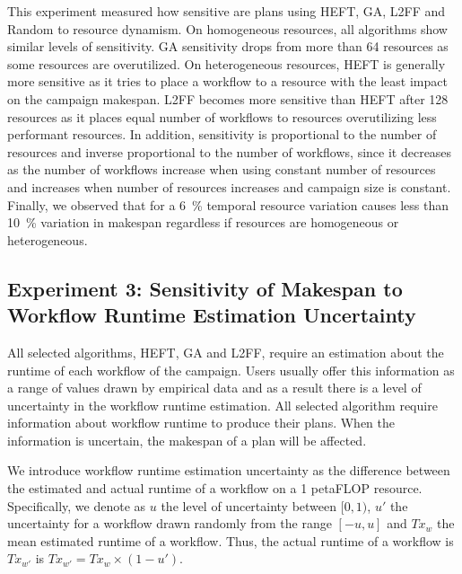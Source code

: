 This experiment measured how sensitive are plans using HEFT, GA, L2FF and Random to resource dynamism.
On homogeneous resources, all algorithms show similar levels of sensitivity.
GA sensitivity drops from more than 64 resources as some resources are overutilized.
On heterogeneous resources, HEFT is generally more sensitive as it tries to place a workflow to a resource with the least impact on the campaign makespan.
L2FF becomes more sensitive than HEFT after 128 resources as it places equal number of workflows to resources overutilizing less performant resources.
In addition, sensitivity is proportional to the number of resources and inverse proportional to the number of workflows, since it decreases as the number of workflows increase when using constant number of resources and increases when number of resources increases and campaign size is constant.
Finally, we observed that for a 6~\% temporal resource variation causes less than 10~\% variation in makespan regardless if resources are homogeneous or heterogeneous.


\subsection{Experiment 3: Sensitivity of Makespan to Workflow Runtime Estimation Uncertainty}

All selected algorithms, HEFT, GA and L2FF, require an estimation about the runtime of each workflow of the campaign.
Users usually offer this information as a range of values drawn by empirical data and as a result there is a level of uncertainty in the workflow runtime estimation.
All selected algorithm require information about workflow runtime to produce their plans.
When the information is uncertain, the makespan of a plan will be affected.

We introduce workflow runtime estimation uncertainty as the difference between the estimated and actual runtime of a workflow on a 1 petaFLOP resource.
Specifically, we denote as $u$ the level of uncertainty between $[0,1)$, $u'$ the uncertainty for a workflow drawn randomly from the range $[-u,u]$ and $Tx_{w}$ the mean estimated runtime of a workflow.
Thus, the actual runtime of a workflow is $Tx_{w'}$ is $ Tx_{w'} = Tx_{w} \times (1-u')$.

